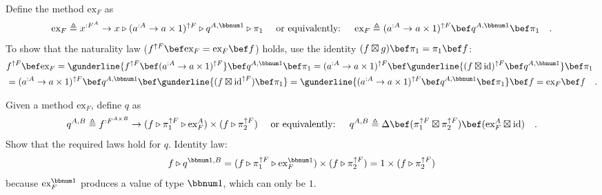 Define the method $\text{ex}_{F}$ as 
\[
\text{ex}_{F}\triangleq x^{:F^{A}}\rightarrow x\triangleright(a^{:A}\rightarrow a\times1)^{\uparrow F}\triangleright q^{A,\bbnum 1}\triangleright\pi_{1}\quad\text{ or equivalently: }\quad\text{ex}_{F}\triangleq(a^{:A}\rightarrow a\times1)^{\uparrow F}\bef q^{A,\bbnum 1}\bef\pi_{1}\quad.
\]
To show that the naturality law ($f^{\uparrow F}\bef\text{ex}_{F}=\text{ex}_{F}\bef f$)
holds, use the identity $(f\boxtimes g)\bef\pi_{1}=\pi_{1}\bef f$:
\begin{align*}
 & f^{\uparrow F}\bef\text{ex}_{F}=\gunderline{f^{\uparrow F}\bef(a^{:A}\rightarrow a\times1)^{\uparrow F}}\bef q^{A,\bbnum 1}\bef\pi_{1}=(a^{:A}\rightarrow a\times1)^{\uparrow F}\bef\gunderline{(f\boxtimes\text{id})^{\uparrow F}\bef q^{A,\bbnum 1}}\bef\pi_{1}\\
 & =(a^{:A}\rightarrow a\times1)^{\uparrow F}\bef q^{A,\bbnum 1}\bef\gunderline{(f\boxtimes\text{id}^{\uparrow F})\bef\pi_{1}}=\gunderline{(a^{:A}\rightarrow a\times1)^{\uparrow F}\bef q^{A,\bbnum 1}\bef\pi_{1}}\bef f=\text{ex}_{F}\bef f\quad.
\end{align*}

Given a method $\text{ex}_{F}$, define $q$ as 
\[
q^{A,B}\triangleq f^{:F^{A\times B}}\rightarrow(f\triangleright\pi_{1}^{\uparrow F}\triangleright\text{ex}_{F}^{A})\times(f\triangleright\pi_{2}^{\uparrow F})\quad\text{ or equivalently: }\quad q^{A,B}\triangleq\Delta\bef(\pi_{1}^{\uparrow F}\boxtimes\pi_{2}^{\uparrow F})\bef(\text{ex}_{F}^{A}\boxtimes\text{id})\quad.
\]
Show that the required laws hold for $q$. Identity law: 
\[
f\triangleright q^{\bbnum 1,B}=(f\triangleright\pi_{1}^{\uparrow F}\triangleright\text{ex}_{F}^{\bbnum 1})\times(f\triangleright\pi_{2}^{\uparrow F})=1\times(f\triangleright\pi_{2}^{\uparrow F})
\]
because $\text{ex}_{F}^{\bbnum 1}$ produces a value of type $\bbnum 1$,
which can only be $1$.

